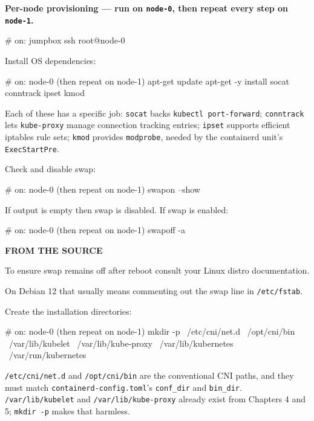 \documentclass[11pt,oneside]{report}
\newcommand{\calloutlabel}[2]{{\sffamily\bfseries\footnotesize\color{#1}#2\quad}}
\begin{document}
\textbf{Per-node
provisioning --- run
on \texttt{node-0},
then repeat every
step on
\texttt{node-1}.}

\begin{cmdlst}
# on: jumpbox
ssh root@node-0
\end{cmdlst}

Install OS
dependencies:

\begin{cmdlst}
# on: node-0 (then repeat on node-1)
{
  apt-get update
  apt-get -y install socat conntrack ipset kmod
}
\end{cmdlst}

Each of these has a
specific job:
\texttt{socat} backs
\texttt{kubectl\ port-}\allowbreak{}\texttt{forward};
\texttt{conntrack}
lets
\texttt{kube-proxy}
manage connection
tracking entries;
\texttt{ipset}
supports efficient
iptables rule sets;
\texttt{kmod}
provides
\texttt{modprobe},
needed by the
containerd unit's
\texttt{ExecStartPre}.

Check and disable
swap:

\begin{cmdlst}
# on: node-0 (then repeat on node-1)
swapon --show
\end{cmdlst}

If output is empty
then swap is
disabled. If swap is
enabled:

\begin{cmdlst}
# on: node-0 (then repeat on node-1)
swapoff -a
\end{cmdlst}

\begin{notebox}\calloutlabel{steel}{FROM THE SOURCE}

To ensure swap
remains off after
reboot consult your
Linux distro
documentation.

\end{notebox}

On Debian 12 that
usually means
commenting out the
swap line in
\texttt{/etc/fstab}.

Create the
installation
directories:

\begin{cmdlst}
# on: node-0 (then repeat on node-1)
mkdir -p \
  /etc/cni/net.d \
  /opt/cni/bin \
  /var/lib/kubelet \
  /var/lib/kube-proxy \
  /var/lib/kubernetes \
  /var/run/kubernetes
\end{cmdlst}

\texttt{/etc/cni/net.d}
and
\texttt{/opt/cni/bin}
are the conventional
CNI paths, and they
must match
\texttt{containerd-}\allowbreak{}\texttt{config.}\allowbreak{}\texttt{toml}'s
\texttt{conf\_dir}
and
\texttt{bin\_dir}.
\texttt{/}\allowbreak{}\texttt{var/}\allowbreak{}\texttt{lib/}\allowbreak{}\texttt{kubelet}
and
\texttt{/}\allowbreak{}\texttt{var/}\allowbreak{}\texttt{lib/}\allowbreak{}\texttt{kube-}\allowbreak{}\texttt{proxy}
already exist from
Chapters 4 and 5;
\texttt{mkdir\ -p}
makes that harmless.
\end{document}
